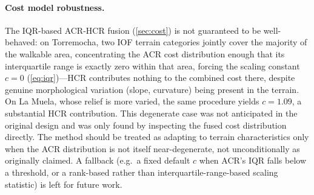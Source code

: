 \documentclass[11pt,a4paper]{article}
\begin{document}
\paragraph{Cost model robustness.}
The IQR-based ACR-HCR fusion (\cref{sec:cost}) is not guaranteed to be well-behaved: on Torremocha, two IOF terrain categories jointly cover the majority of the walkable area, concentrating the ACR cost distribution enough that its interquartile range is exactly zero within that area, forcing the scaling constant $c=0$ (\cref{eq:iqr})---HCR contributes nothing to the combined cost there, despite genuine morphological variation (slope, curvature) being present in the terrain. On La Muela, whose relief is more varied, the same procedure yields $c=1.09$, a substantial HCR contribution. This degenerate case was not anticipated in the original design and was only found by inspecting the fused cost distribution directly. The method should be treated as adapting to terrain characteristics only when the ACR distribution is not itself near-degenerate, not unconditionally as originally claimed. A fallback (e.g.\ a fixed default $c$ when ACR's IQR falls below a threshold, or a rank-based rather than interquartile-range-based scaling statistic) is left for future work.
\end{document}

